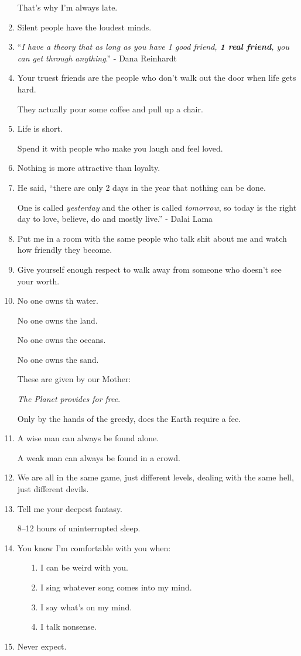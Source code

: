 \documentclass{article}
\begin{document}
\begin{enumerate}
	That's why I'm always late.
	\item Silent people have the loudest minds.
	\item ``\textit{I have a theory that as long as you have 1 good friend, \textbf{1 real friend}, you can get through anything}.'' - Dana Reinhardt
	\item Your truest friends are the people who don't walk out the door when life gets hard.
	
	They actually pour some coffee and pull up a chair.
	\item Life is short.
	
	Spend it with people who make you laugh and feel loved.
	\item Nothing is more attractive than loyalty.
	\item He said, ``there are only 2 days in the year that nothing can be done.
	
	One is called \textit{yesterday} and the other is called \textit{tomorrow}, so today is the right day to love, believe, do and mostly live.'' - Dalai Lama
	\item Put me in a room with the same people who talk shit about me and watch how friendly they become.
	\item Give yourself enough respect to walk away from someone who doesn't see your worth.
	\item No one owns th water.
	
	No one owns the land.
	
	No one owns the oceans.
	
	No one owns the sand.
	
	These are given by our Mother:
	
	\textit{The Planet provides for free}.
	
	Only by the hands of the greedy, does the Earth require a fee.
	\item A wise man can always be found alone.
	
	A weak man can always be found in a crowd.
	\item We are all in the same game, just different levels, dealing with the same hell, just different devils.
	\item Tell me your deepest fantasy.
	
	8--12 hours of uninterrupted sleep.
	\item You know I'm comfortable with you when:
	\begin{itemize}
		\item[1.] I can be weird with you.
		\item[2.] I sing whatever song comes into my mind.
		\item[3.] I say what's on my mind.
		\item[4.] I talk nonsense.
	\end{itemize}
	\item Never expect.
	

\end{enumerate}
\end{document}
